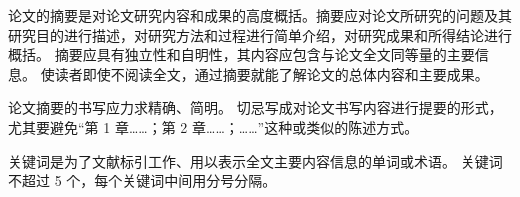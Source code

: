 \documentclass[degree=doctor]{thuthesis}
\begin{document}
\START
\showoutput


\begin{cabstract}
  论文的摘要是对论文研究内容和成果的高度概括。摘要应对论文所研究的问题及其研究目的进行描述，对研究方法和过程进行简单介绍，对研究成果和所得结论进行概括。
  摘要应具有独立性和自明性，其内容应包含与论文全文同等量的主要信息。
  使读者即使不阅读全文，通过摘要就能了解论文的总体内容和主要成果。

  论文摘要的书写应力求精确、简明。
  切忌写成对论文书写内容进行提要的形式，尤其要避免“第 1 章……；第 2 章……；……”这种或类似的陈述方式。

  关键词是为了文献标引工作、用以表示全文主要内容信息的单词或术语。
  关键词不超过 5 个，每个关键词中间用分号分隔。
\end{cabstract}

\makeatletter
\thu@makeabstract@zh

\clearpage
\OMIT
\end{document}
